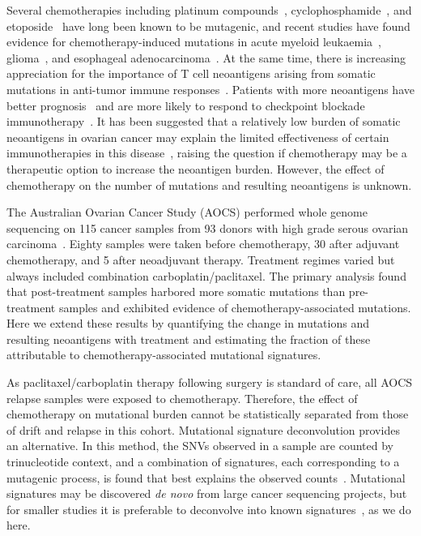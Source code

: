Several chemotherapies including platinum compounds~\cite{Hannan_1989}, cyclophosphamide~\cite{Anderson_1995}, and etoposide~\cite{NAKANOMYO_1986} have long been known to be mutagenic, and recent studies have found evidence for chemotherapy-induced mutations in acute myeloid leukaemia~\cite{Ding_2012}, glioma~\cite{Johnson_2013}, and esophageal adenocarcinoma~\cite{Murugaesu_2015}. At the same time, there is increasing appreciation for the importance of T cell neoantigens arising from somatic mutations in anti-tumor immune responses~\cite{Schumacher_2015}. Patients with more neoantigens have better prognosis~\cite{Brown_2014} and are more likely to respond to checkpoint blockade immunotherapy~\cite{Van_Allen_2015,Rizvi_2015}. It has been suggested that a relatively low burden of somatic neoantigens in ovarian cancer may explain the limited effectiveness of certain immunotherapies in this disease~\cite{Martin_2016}, raising the question if chemotherapy may be a therapeutic option to increase the neoantigen burden. However, the effect of chemotherapy on the number of mutations and resulting neoantigens is unknown.

The Australian Ovarian Cancer Study (AOCS) performed whole genome sequencing on 115 cancer samples from 93 donors with high grade serous ovarian carcinoma~\cite{Patch_2015}. Eighty samples were taken before chemotherapy, 30 after adjuvant chemotherapy, and 5 after neoadjuvant therapy. Treatment regimes varied but always included combination carboplatin/paclitaxel. The primary analysis found that post-treatment samples harbored more somatic mutations than pre-treatment samples and exhibited evidence of chemotherapy-associated mutations. Here we extend these results by quantifying the change in mutations and resulting neoantigens with treatment and estimating the fraction of these attributable to chemotherapy-associated mutational signatures.

As paclitaxel/carboplatin therapy following surgery is standard of care, all AOCS relapse samples were exposed to chemotherapy. Therefore, the effect of chemotherapy on mutational burden cannot be statistically separated from those of drift and relapse in this cohort. Mutational signature deconvolution provides an alternative. In this method, the SNVs observed in a sample are counted by trinucleotide context, and a combination of signatures, each corresponding to a mutagenic process, is found that best explains the observed counts~\cite{Alexandrov2013}. Mutational signatures may be discovered \textit{de novo} from large cancer sequencing projects, but for smaller studies it is preferable to deconvolve into known signatures~\cite{Rosenthal_2016}, as we do here.

